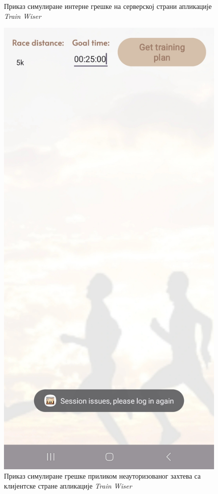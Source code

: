 \documentclass[12pt,oneside]{memoir}
\begin{document}
\begin{figure}[H]
\begin{minipage}{0.45\textwidth}
    \caption{Приказ симулиране интерне грешке на серверској страни апликације \textit{Train Wiser}}
  \label{pic:error-500}
  \end{minipage}
  \hfill
  \begin{minipage}{0.45\textwidth}
    \centering
  \includegraphics[scale=0.131]{assets/pictures/errors/server_401_error.jpg}
    \caption{Приказ симулиране грешке приликом неауторизованог захтева са клијентске стране апликације \textit{Train Wiser}}
  \label{pic:error-401}
  \end{minipage}
\end{figure}
\end{document}
